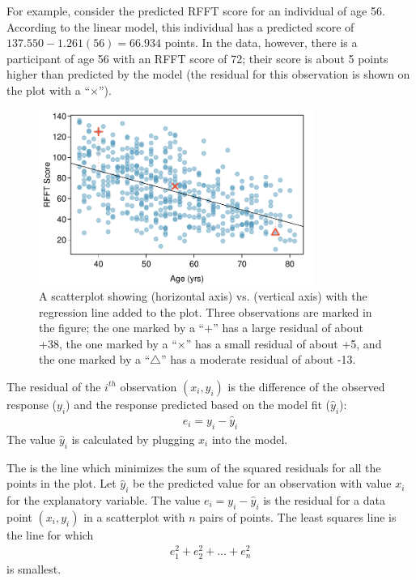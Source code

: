 For example, consider the predicted RFFT score for an individual of age 56. According to the linear model, this individual has a predicted score of $137.550 - 1.261(56) = 66.934$ points. In the data, however, there is a participant of age 56 with an RFFT score of 72; their score is about 5 points higher than predicted by the model (the residual for this observation is shown on the plot with a ``$\times$'').

\begin{figure}[h!]
	\centering
	\includegraphics[width=0.8\textwidth]
	{ch_simple_linear_regression_oi_biostat/figures/prevendResid/prevendResid.pdf}
	\caption{A scatterplot showing  (horizontal axis) vs.  (vertical axis) with the regression line added to the plot. Three observations are marked in the figure; the one marked by a ``$+$'' has a large residual of about +38, the one marked by a ``$\times$'' has a small residual of about +5, and the one marked by a ``$\triangle$'' has a moderate residual of about -13.}
	\label{prevendResid}
\end{figure}

\begin{termBox}{
The residual of the $i^{th}$ observation $(x_i, y_i)$ is the difference of the observed response ($y_i$) and the response predicted based on the model fit ($\widehat{y}_i$):
\begin{eqnarray*}
e_i = y_i - \widehat{y}_i
\end{eqnarray*}
The value $\widehat{y}_i$ is calculated by plugging $x_i$ into the model.}
\end{termBox}

The  is the line which minimizes the sum of the squared residuals for all the points in the plot.  Let $\hat{y}_i$ be the predicted value for an observation with value $x_i$ for the explanatory variable.  The value $e_i = y_i - \hat{y}_i$ is the residual for a data point $(x_i, y_i)$ in a scatterplot with $n$ pairs of points.  The least squares line is the line for which
\begin{eqnarray}
e_{1}^2 + e_{2}^2 + \dots + e_{n}^2
\label{sumOfSquaresForResiduals}
\end{eqnarray}
is smallest.


